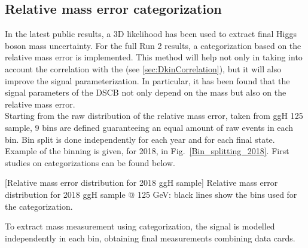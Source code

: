 \subsection{Relative mass error categorization}
\label{sec:SignalParam_N_2D}
In the latest public results, %
a 3D likelihood has been used to extract final Higgs boson mass uncertainty. 
For the full Run 2 results, a categorization based on the relative mass error is implemented.
This method will help not only in taking into account the correlation with the \Dkinbkg (see \ref{sec:DkinCorrelation}), but it will also improve the signal parameterization.
In particular, it has been found that the signal parameters of the DSCB not only depend on the mass but also on the relative mass error.\\
Starting from the raw distribution of the relative mass error, taken from ggH 125 \GeV sample, 
9 bins are defined guaranteeing an equal amount of raw events in each bin. Bin split 
is done independently for each year and for each final state. Example of the binning is given, 
for 2018, in  Fig.~\ref{Bin_splitting_2018}. First studies on categorizations can be found below. %
\begin{multiFigure}
    \begin{center}
        [Relative mass error distribution for 2018 ggH sample]
        {Relative mass error distribution for 2018 ggH sample @ 125 GeV: black lines show 
        the bins used for the categorization.}
    \label{Bin_splitting_2018}
    \end{center}
\end{multiFigure}
To extract mass measurement using categorization, the signal is modelled independently in each bin, 
obtaining final measurements combining data cards. \\

